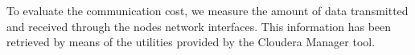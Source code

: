 \documentclass[preprint,review,12pt]{elsarticle}
\begin{document}
%
%
%




To evaluate the communication cost, we measure the amount of data transmitted and received
through the nodes network interfaces. This information has been retrieved
by means of the utilities provided by the Cloudera Manager tool.
\end{document}

